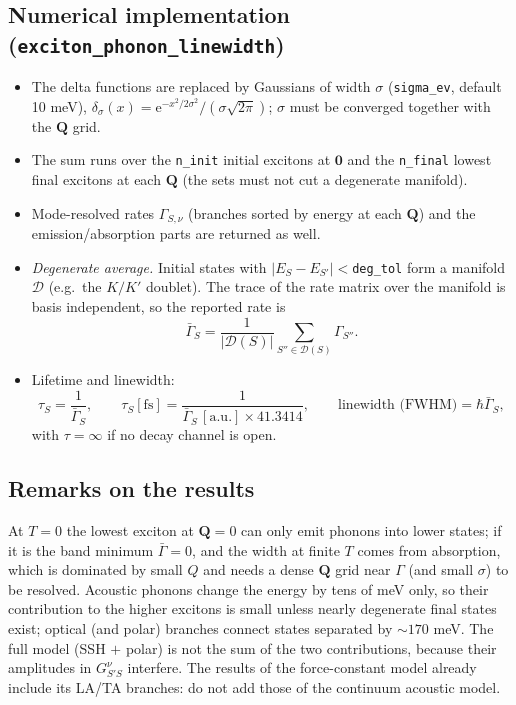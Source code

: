 \documentclass[11pt,a4paper]{article}
\newcommand{\ee}{\mathrm{e}}
\newcommand{\QQ}{\bm{Q}}
\newcommand{\code}[1]{\texttt{#1}}
\begin{document}
\subsection{Numerical implementation (\code{exciton\_phonon\_linewidth})}
\begin{itemize}[leftmargin=*,itemsep=0pt]
\item The delta functions are replaced by Gaussians of width $\sigma$ (\code{sigma\_ev}, default 10 meV),
$\delta_\sigma(x)=\ee^{-x^2/2\sigma^2}/(\sigma\sqrt{2\pi})$; $\sigma$ must be converged together with the $\QQ$ grid.
\item The sum runs over the \code{n\_init} initial excitons at $\bm0$ and the \code{n\_final} lowest final excitons at each $\QQ$ (the sets must not cut a degenerate manifold).
\item Mode-resolved rates $\Gamma_{S,\nu}$ (branches sorted by energy at each $\QQ$) and the emission/absorption parts are returned as well.
\item \emph{Degenerate average.} Initial states with $|E_S-E_{S'}|<$\code{deg\_tol} form a manifold $\mathcal D$ (e.g.\ the $K/K'$ doublet). The trace of the rate matrix over the manifold is basis independent, so the reported rate is
\begin{equation}
\bar\Gamma_S=\frac{1}{|\mathcal D(S)|}\sum_{S''\in\mathcal D(S)}\Gamma_{S''}.
\end{equation}
\item Lifetime and linewidth:
\begin{equation}
\tau_S=\frac{1}{\bar\Gamma_S},\qquad \tau_S[\text{fs}]=\frac{1}{\bar\Gamma_S\,[\text{a.u.}]\times41.3414},\qquad
\text{linewidth (FWHM)}=\hbar\bar\Gamma_S ,
\end{equation}
with $\tau=\infty$ if no decay channel is open.
\end{itemize}

\subsection{Remarks on the results}
At $T=0$ the lowest exciton at $\bm Q=0$ can only emit phonons into lower states; if it is the band minimum $\bar\Gamma=0$, and the width at finite $T$ comes from absorption, which is dominated by small $Q$ and needs a dense $\QQ$ grid near $\Gamma$ (and small $\sigma$) to be resolved. Acoustic phonons change the energy by tens of meV only, so their contribution to the higher excitons is small unless nearly degenerate final states exist; optical (and polar) branches connect states separated by $\sim170$ meV. The full model (SSH $+$ polar) is not the sum of the two contributions, because their amplitudes in $G^\nu_{S'S}$ interfere. The results of the force-constant model already include its LA/TA branches: do not add those of the continuum acoustic model.
\end{document}
